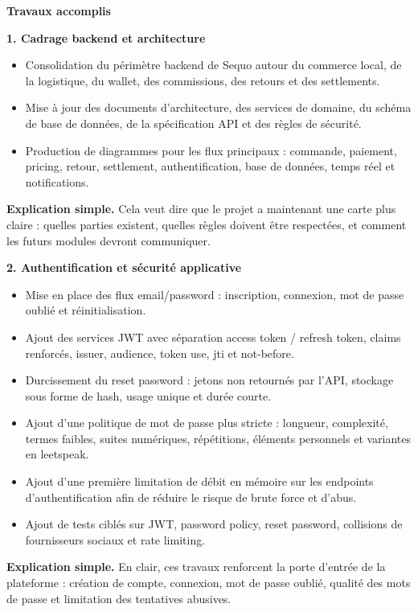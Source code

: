 \documentclass[11pt,letterpaper]{article}
\newcommand{\sectiontitle}[1]{%
  \vspace{0.55em}
  {\Large\bfseries\color{SequoInk}#1}\par
  \vspace{0.1em}
}
\newcommand{\subsectiontitle}[1]{%
  \vspace{0.35em}
  {\large\bfseries\color{SequoInk}#1}\par
}
\newcommand{\simpleexplanation}[1]{%
  {\small\textbf{\color{SequoBlue}Explication simple.} \color{SequoMuted}#1\par}
}
\begin{document}
\newpage
\sectiontitle{Travaux accomplis}

\subsectiontitle{1. Cadrage backend et architecture}
\begin{itemize}
  \item Consolidation du périmètre backend de Sequo autour du commerce local, de la logistique, du wallet, des commissions, des retours et des settlements.
  \item Mise à jour des documents d'architecture, des services de domaine, du schéma de base de données, de la spécification API et des règles de sécurité.
  \item Production de diagrammes pour les flux principaux : commande, paiement, pricing, retour, settlement, authentification, base de données, temps réel et notifications.
\end{itemize}
\simpleexplanation{Cela veut dire que le projet a maintenant une carte plus claire : quelles parties existent, quelles règles doivent être respectées, et comment les futurs modules devront communiquer.}

\subsectiontitle{2. Authentification et sécurité applicative}
\begin{itemize}
  \item Mise en place des flux email/password : inscription, connexion, mot de passe oublié et réinitialisation.
  \item Ajout des services JWT avec séparation access token / refresh token, claims renforcés, issuer, audience, token use, jti et not-before.
  \item Durcissement du reset password : jetons non retournés par l'API, stockage sous forme de hash, usage unique et durée courte.
  \item Ajout d'une politique de mot de passe plus stricte : longueur, complexité, termes faibles, suites numériques, répétitions, éléments personnels et variantes en leetspeak.
  \item Ajout d'une première limitation de débit en mémoire sur les endpoints d'authentification afin de réduire le risque de brute force et d'abus.
  \item Ajout de tests ciblés sur JWT, password policy, reset password, collisions de fournisseurs sociaux et rate limiting.
\end{itemize}
\simpleexplanation{En clair, ces travaux renforcent la porte d'entrée de la plateforme : création de compte, connexion, mot de passe oublié, qualité des mots de passe et limitation des tentatives abusives.}
\end{document}

